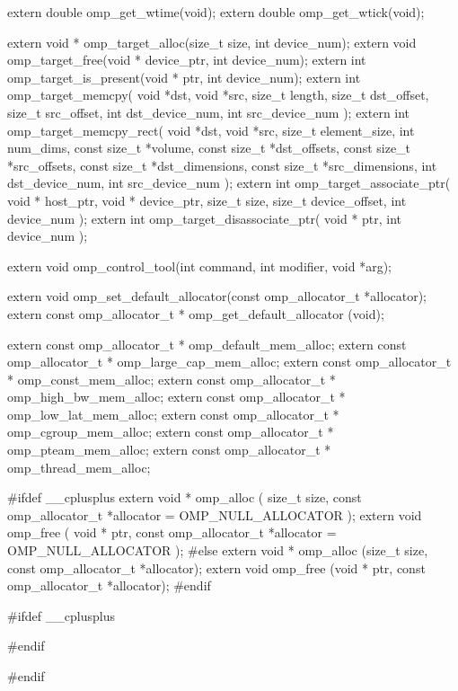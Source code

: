 {\begin{ompcFunction}
{extern double omp_get_wtime(void);
extern double omp_get_wtick(void);

extern void * omp_target_alloc(size_t size, int device_num);
extern void omp_target_free(void * device_ptr, int device_num);
extern int omp_target_is_present(void * ptr, int device_num);
extern int omp_target_memcpy(
  void *dst,
  void *src,
  size_t length,
  size_t dst_offset,
  size_t src_offset,
  int dst_device_num,
  int src_device_num
);
extern int omp_target_memcpy_rect(
  void *dst,
  void *src,
  size_t element_size,
  int num_dims,
  const size_t *volume,
  const size_t *dst_offsets,
  const size_t *src_offsets,
  const size_t *dst_dimensions,
  const size_t *src_dimensions,
  int dst_device_num,
  int src_device_num
);
extern int omp_target_associate_ptr(
  void * host_ptr,
  void * device_ptr,
  size_t size,
  size_t device_offset,
  int device_num
);
extern int omp_target_disassociate_ptr(
  void * ptr,
  int device_num
);

extern void omp_control_tool(int command, int modifier, void *arg);

extern void omp_set_default_allocator(const omp_allocator_t *allocator);
extern const omp_allocator_t * omp_get_default_allocator (void);


extern const omp_allocator_t * omp_default_mem_alloc;
extern const omp_allocator_t * omp_large_cap_mem_alloc;
extern const omp_allocator_t * omp_const_mem_alloc;
extern const omp_allocator_t * omp_high_bw_mem_alloc;
extern const omp_allocator_t * omp_low_lat_mem_alloc;
extern const omp_allocator_t * omp_cgroup_mem_alloc;
extern const omp_allocator_t * omp_pteam_mem_alloc;
extern const omp_allocator_t * omp_thread_mem_alloc;


#ifdef __cplusplus
extern void * omp_alloc (
  size_t size,
  const omp_allocator_t *allocator = OMP_NULL_ALLOCATOR
);
extern void omp_free (
  void * ptr,
  const omp_allocator_t *allocator = OMP_NULL_ALLOCATOR
);
#else
extern void * omp_alloc (size_t size, const omp_allocator_t *allocator);
extern void omp_free (void * ptr, const omp_allocator_t *allocator);
#endif


#ifdef __cplusplus
}
#endif

#endif
\end{ompcFunction}} %


